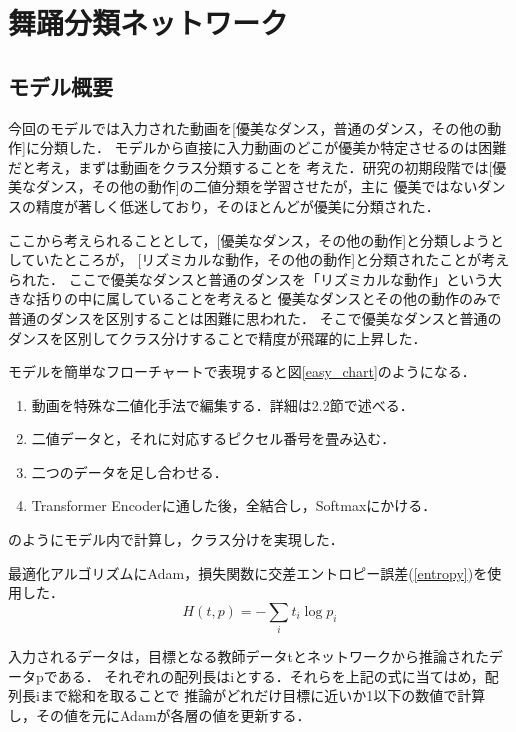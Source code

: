 \section{舞踊分類ネットワーク}

\subsection{モデル概要}
今回のモデルでは入力された動画を[優美なダンス，普通のダンス，その他の動作]に分類した．
モデルから直接に入力動画のどこが優美か特定させるのは困難だと考え，まずは動画をクラス分類することを
考えた．研究の初期段階では[優美なダンス，その他の動作]の二値分類を学習させたが，主に
優美ではないダンスの精度が著しく低迷しており，そのほとんどが優美に分類された．

ここから考えられることとして，[優美なダンス，その他の動作]と分類しようとしていたところが，
[リズミカルな動作，その他の動作]と分類されたことが考えられた．
ここで優美なダンスと普通のダンスを「リズミカルな動作」という大きな括りの中に属していることを考えると
優美なダンスとその他の動作のみで普通のダンスを区別することは困難に思われた．
そこで優美なダンスと普通のダンスを区別してクラス分けすることで精度が飛躍的に上昇した．

モデルを簡単なフローチャートで表現すると図\ref{easy_chart}のようになる．
\begin{enumerate}
  \item 動画を特殊な二値化手法で編集する．詳細は2.2節で述べる．
  \item 二値データと，それに対応するピクセル番号を畳み込む．
  \item 二つのデータを足し合わせる．
  \item Transformer Encoderに通した後，全結合し，Softmaxにかける．
\end{enumerate}
のようにモデル内で計算し，クラス分けを実現した．

最適化アルゴリズムにAdam\cite{adam}，損失関数に交差エントロピー誤差(\ref{entropy})を使用した．
\begin{equation}
  H(t, p) = -\sum_{i}t_i\log p_i
  \label{entropy}
\end{equation}

入力されるデータは，目標となる教師データtとネットワークから推論されたデータpである．
それぞれの配列長はiとする．それらを上記の式に当てはめ，配列長iまで総和を取ることで
推論がどれだけ目標に近いか1以下の数値で計算し，その値を元にAdamが各層の値を更新する．
\clearpage

